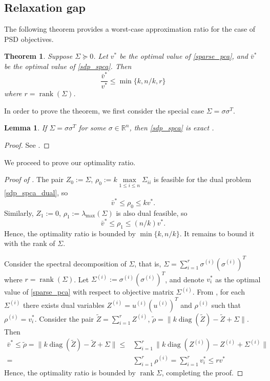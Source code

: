 \documentclass[11pt]{amsart}
\theoremstyle{plain}
\newtheorem{thm}{Theorem}[section]
\newtheorem{lem}{Lemma}[section]
\theoremstyle{definition}
\theoremstyle{remark}
\DeclareMathOperator{\rank}{rank}
\DeclareMathOperator{\diag}{diag}
\begin{document}
	\subsection{Relaxation gap}
	
	The following theorem provides a worst-case approximation ratio for the case of PSD objectives.
	
	\begin{thm}\label{thm:opt_ratio_spca}
		Suppose $\Sigma \succeq 0$.
		Let $v^*$ be the optimal value of \eqref{sparse_pca}, and $\bar v^*$ be the optimal value of \eqref{sdp_spca}.
		Then
		\[
		\frac{\bar v^*}{v^*} \leq  \min\{k,n/k,r\}
		\]
		where $r = \rank(\Sigma)$.
	\end{thm}
	
	In order to prove the theorem, we first consider the special case $\Sigma = \sigma \sigma^T$.
	
	\begin{lem}\label{lem:rank_one_case}
		If $\Sigma =\sigma\sigma^T$ for some $\sigma\in\mathbb{R}^n$, then \eqref{sdp_spca} is exact .
	\end{lem}
	\begin{proof}
		See .
	\end{proof}
	
	We proceed to prove our optimality ratio.
	
	\begin{proof}[Proof of ]
		The pair $Z_0:=\Sigma$, $\rho_0 := k \max\limits_{1\leq i\leq n} \Sigma_{ii}$ is feasible for the dual problem \eqref{sdp_spca_dual}, so
		\[
		\bar v^* \leq \rho_0 \leq k v^*.
		\]
		Similarly, $Z_1:=0$, $\rho_1:= \lambda_{\max}(\Sigma)$ is also dual feasible, so
		\[
		\bar v^* \leq \rho_1 \leq (n/k)v^*.
		\]
		Hence, the optimality ratio is bounded by $\min\{k,n/k\}$.
		It remains to bound it with the rank of $\Sigma$. 
		
		Consider the spectral decomposition of $\Sigma$, that is, $\Sigma = \sum_{i=1}^r \sigma^{(i)} (\sigma^{(i)})^T$ where $r = \rank(\Sigma)$. Let $\Sigma^{(i)}:=\sigma^{(i)}(\sigma^{(i)})^T$, and denote $v^*_i$ as the optimal value of \eqref{sparse_pca} with respect to objective matrix $\Sigma^{(i)}$. From , for each $\Sigma^{(i)}$ there exists dual variables $Z^{(i)} = u^{(i)}(u^{(i)})^T$ and $\rho^{(i)}$ such that $\rho^{(i)} = v^*_i$. 
		Consider the pair $\tilde Z = \sum_{i=1}^r Z^{(i)}$, $\tilde\rho = \big\|k\diag(\tilde Z) - \tilde Z  +\Sigma\big\|$.
		Then
		\begin{equation}
			\begin{split}
				\bar v^*\leq
                \tilde\rho = \big\|k\diag(\tilde Z) - \tilde Z  +\Sigma\big\|
                \leq & \sum_{i=1}^r \big\|k\diag(Z^{(i)}) - Z^{(i)}  +\Sigma^{(i)}\big\|\\
				= &\sum_{i=1}^r \rho^{(i)}=\sum_{i=1}^r v^*_i \leq rv^*
			\end{split}
		\end{equation}
		Hence, the optimality ratio is bounded by $\rank \Sigma$, completing the proof.
	\end{proof}
	
\end{document}
